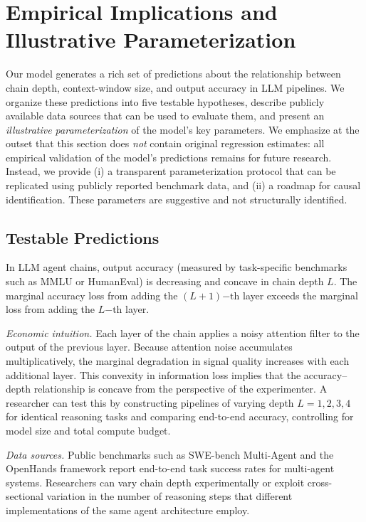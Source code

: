 \section{Empirical Implications and Illustrative Parameterization}
\label{sec:empirics}

Our model generates a rich set of predictions about the relationship between chain depth, context-window size, and output accuracy in LLM pipelines. We organize these predictions into five testable hypotheses, describe publicly available data sources that can be used to evaluate them, and present an \emph{illustrative parameterization} of the model's key parameters. We emphasize at the outset that this section does \emph{not} contain original regression estimates: all empirical validation of the model's predictions remains for future research. Instead, we provide (i) a transparent parameterization protocol that can be replicated using publicly reported benchmark data, and (ii) a roadmap for causal identification. These parameters are suggestive and not structurally identified.

\subsection{Testable Predictions}
\label{subsec:predictions}

\begin{prediction}\label{pred:depth_accuracy}
In LLM agent chains, output accuracy (measured by task-specific benchmarks such as MMLU or HumanEval) is decreasing and concave in chain depth $L$. The marginal accuracy loss from adding the $(L+1)$$-$$\text{th}$ layer exceeds the marginal loss from adding the $L$$-\text{th}$ layer.
\end{prediction}

\textit{Economic intuition.} Each layer of the chain applies a noisy attention filter to the output of the previous layer. Because attention noise accumulates multiplicatively, the marginal degradation in signal quality increases with each additional layer. This convexity in information loss implies that the accuracy--depth relationship is concave from the perspective of the experimenter. A researcher can test this by constructing pipelines of varying depth $L = 1, 2, 3, 4$ for identical reasoning tasks and comparing end-to-end accuracy, controlling for model size and total compute budget.

\textit{Data sources.} Public benchmarks such as SWE-bench Multi-Agent \citep{jimenez2024swe} and the OpenHands framework \citep{wang2024openhands} report end-to-end task success rates for multi-agent systems. Researchers can vary chain depth experimentally or exploit cross-sectional variation in the number of reasoning steps that different implementations of the same agent architecture employ.

